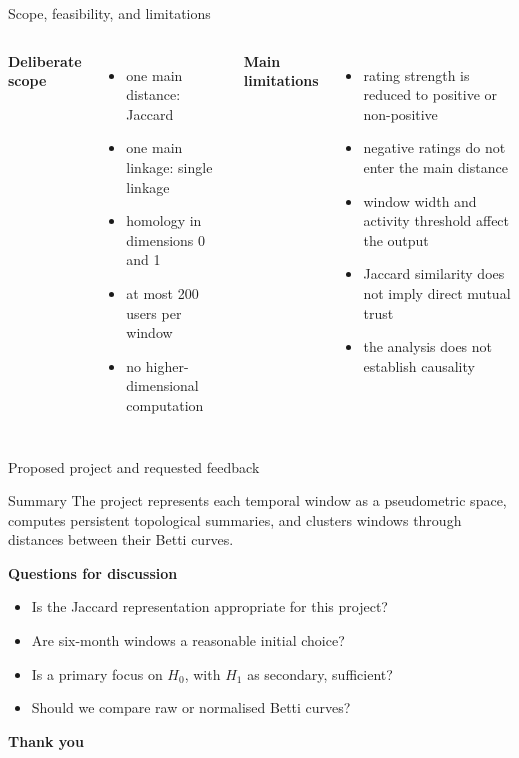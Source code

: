\documentclass[aspectratio=169,11pt]{beamer}
\newcommand{\term}[1]{\textcolor{Ocean}{\textbf{#1}}}
\begin{document}
\begin{frame}{Scope, feasibility, and limitations}
  \begin{columns}[T,onlytextwidth]
      \term{Deliberate scope}
      \begin{itemize}
        \item one main distance: Jaccard
        \item one main linkage: single linkage
        \item homology in dimensions 0 and 1
        \item at most 200 users per window
        \item no higher-dimensional computation
      \end{itemize}

      \term{Main limitations}
      \begin{itemize}
        \item rating strength is reduced to positive or non-positive
        \item negative ratings do not enter the main distance
        \item window width and activity threshold affect the output
        \item Jaccard similarity does not imply direct mutual trust
        \item the analysis does not establish causality
      \end{itemize}
  \end{columns}
\end{frame}

\begin{frame}{Proposed project and requested feedback}
  \begin{block}{Summary}
    The project represents each temporal window as a pseudometric space, computes persistent topological summaries, and clusters windows through distances between their Betti curves.
  \end{block}

  \vspace{0.25cm}
  \term{Questions for discussion}
  \begin{itemize}
    \item Is the Jaccard representation appropriate for this project?
    \item Are six-month windows a reasonable initial choice?
    \item Is a primary focus on $H_0$, with $H_1$ as secondary, sufficient?
    \item Should we compare raw or normalised Betti curves?
  \end{itemize}

  \vfill
  \centering
  {\Large\color{Ocean}\textbf{Thank you}}
\end{frame}
\end{document}
